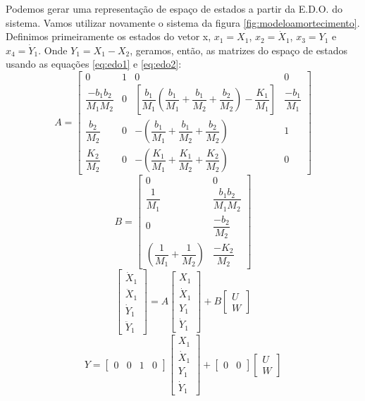 Podemos gerar uma representação de espaço de estados a partir da E.D.O. do sistema. Vamos utilizar novamente o sistema da figura \ref{fig:modeloamortecimento}. Definimos primeiramente os estados do vetor x, $x_1=X_1$, $x_2=\dot{X}_1$, $x_3=Y_1$ e $x_4=\dot{Y}_1$. Onde $Y_1=X_1-X_2$, geramos, então, as matrizes do espaço de estados usando as equações \eqref{eq:edo1} e \eqref{eq:edo2}:
\begin{equation}
A=\begin{bmatrix}
0 & 1 & 0 & 0\\
\dfrac{-b_1b_2}{M_1M_2} & 0 &\left[ \dfrac {b_1} {M_1} \left( \dfrac {b_1} {M_1} + \dfrac{b_1}{M_2} +\dfrac{b_2}{M_2} \right)- \dfrac{K_1}{M_1}\right] & \dfrac{-b_1}{M_1}\\
\dfrac{b_2}{M_2} & 0 & -\left( \dfrac{b_1}{M_1}+ \dfrac{b_1}{M_2}+ \dfrac{b_2}{M_2} \right) & 1\\
\dfrac{K_2}{M_2} & 0 & -\left( \dfrac{K_1}{M_1} +\dfrac{K_1}{M_2}+ \dfrac{K_2}{M_2} \right) & 0
\end{bmatrix}
\end{equation}
\begin{equation}
B=\begin{bmatrix}
0 & 0 \\
\dfrac{1}{M_1} & \dfrac{b_1b_2}{M_1M_2}\\
0 & \dfrac{-b_2}{M_2} \\
\left( \dfrac{1}{M_1}+ \dfrac{1}{M_2} \right) & \dfrac{-K_2}{M_2}
\end{bmatrix}
\end{equation}
\begin{equation}
\begin{bmatrix}
\dot{X}_1\\
\ddot{X}_1\\
\dot{Y}_1\\
\ddot{Y}_1
\end{bmatrix}
=
A
\begin{bmatrix}
X_1\\\dot{X}_1 \\Y_1 \\ \dot{Y}_1
\end{bmatrix}
+
B
\begin{bmatrix}
U\\W
\end{bmatrix}
\end{equation}
\begin{equation}
Y=
\begin{bmatrix}
0 & 0 & 1 & 0
\end{bmatrix}
\begin{bmatrix}
X_1\\\dot{X}_1\\Y_1\\\dot{Y}_1
\end{bmatrix}
+
\begin{bmatrix}
0 & 0
\end{bmatrix}
\begin{bmatrix}
U \\W
\end{bmatrix}
\end{equation}

